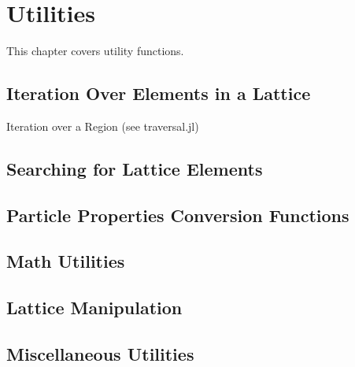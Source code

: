 \chapter{Utilities}
\label{c:utilities}

This chapter covers utility functions.

\section{Iteration Over Elements in a Lattice}
\label{s:iteration}

Iteration over a Region (see traversal.jl)

\section{Searching for Lattice Elements}
\label{s:search}

\section{Particle Properties Conversion Functions}
\label{s:conversion}

\section{Math Utilities}
\label{s:math}

\section{Lattice Manipulation}
\label{s:manipulation}

\section{Miscellaneous Utilities}
\label{s:misc.utilities}

